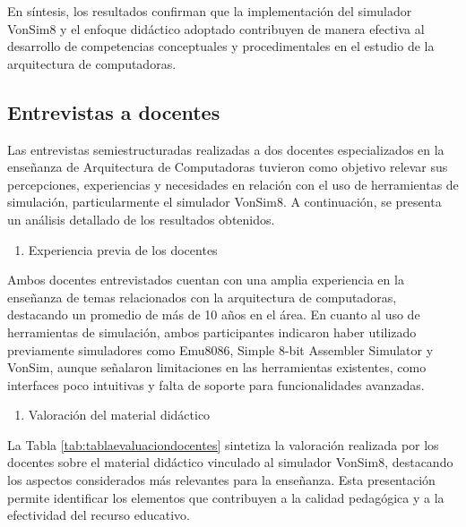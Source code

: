 \documentclass[12pt,oneside]{templates/unerthesis}
\providecommand{\tightlist}{%
  \setlength{\itemsep}{0pt}\setlength{\parskip}{0pt}}
\begin{document}
En síntesis, los resultados confirman que la implementación del simulador VonSim8 y el enfoque didáctico adoptado contribuyen de manera efectiva al desarrollo de competencias conceptuales y procedimentales en el estudio de la arquitectura de computadoras.

\hypertarget{entrevistas-a-docentes}{%
\subsection{Entrevistas a docentes}\label{entrevistas-a-docentes}}

Las entrevistas semiestructuradas realizadas a dos docentes especializados en la enseñanza de Arquitectura de Computadoras tuvieron como objetivo relevar sus percepciones, experiencias y necesidades en relación con el uso de herramientas de simulación, particularmente el simulador VonSim8. A continuación, se presenta un análisis detallado de los resultados obtenidos.

\begin{enumerate}
\def\labelenumi{\arabic{enumi}.}
\tightlist
\item
  Experiencia previa de los docentes
\end{enumerate}

Ambos docentes entrevistados cuentan con una amplia experiencia en la enseñanza de temas relacionados con la arquitectura de computadoras, destacando un promedio de más de 10 años en el área. En cuanto al uso de herramientas de simulación, ambos participantes indicaron haber utilizado previamente simuladores como Emu8086, Simple 8-bit Assembler Simulator y VonSim, aunque señalaron limitaciones en las herramientas existentes, como interfaces poco intuitivas y falta de soporte para funcionalidades avanzadas.

\begin{enumerate}
\def\labelenumi{\arabic{enumi}.}
\setcounter{enumi}{1}
\tightlist
\item
  Valoración del material didáctico
\end{enumerate}

La Tabla \ref{tab:tablaevaluaciondocentes} sintetiza la valoración realizada por los docentes sobre el material didáctico vinculado al simulador VonSim8, destacando los aspectos considerados más relevantes para la enseñanza. Esta presentación permite identificar los elementos que contribuyen a la calidad pedagógica y a la efectividad del recurso educativo.
\end{document}
